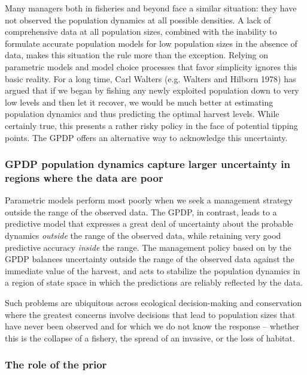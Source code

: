 \documentclass[author-year, 12pt,review]{components/elsarticle} %
\begin{document}
Many managers both in fisheries and beyond face a similar situation:
they have not observed the population dynamics at all possible
densities. A lack of comprehensive data at all population sizes,
combined with the inability to formulate accurate population models for
low population sizes in the absence of data, makes this situation the
rule more than the exception. Relying on parametric models and model
choice processes that favor simplicity ignores this basic reality. For a
long time, Carl Walters (e.g. Walters and Hilborn 1978) has argued that
if we began by fishing any newly exploited population down to very low
levels and then let it recover, we would be much better at estimating
population dynamics and thus predicting the optimal harvest levels.
While certainly true, this presents a rather risky policy in the face of
potential tipping points. The GPDP offers an alternative way to
acknowledge this uncertainty.

\subsubsection{GPDP population dynamics capture larger uncertainty in
regions where the data are
poor}\label{gpdp-population-dynamics-capture-larger-uncertainty-in-regions-where-the-data-are-poor}

Parametric models perform most poorly when we seek a management strategy
outside the range of the observed data. The GPDP, in contrast, leads to
a predictive model that expresses a great deal of uncertainty about the
probable dynamics \emph{outside} the range of the observed data, while
retaining very good predictive accuracy \emph{inside} the range. The
management policy based on by the GPDP balances uncertainty outside the
range of the observed data against the immediate value of the harvest,
and acts to stabilize the population dynamics in a region of state space
in which the predictions are reliably reflected by the data.

Such problems are ubiquitous across ecological decision-making and
conservation where the greatest concerns involve decisions that lead to
population sizes that have never been observed and for which we do not
know the response -- whether this is the collapse of a fishery, the
spread of an invasive, or the loss of habitat.

\subsubsection{The role of the prior}\label{the-role-of-the-prior}
\end{document}

